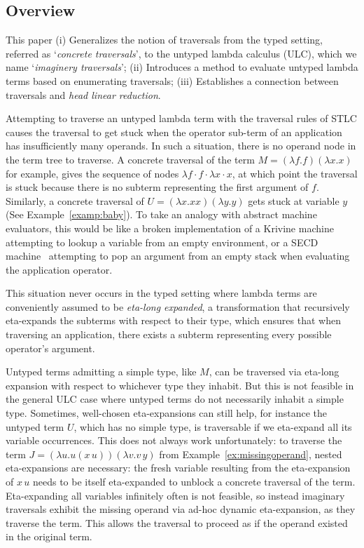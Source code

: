 \documentclass{elsarticle}
\theoremstyle{plain}
\theoremstyle{definition}
\begin{document}
\subsection{Overview}
This paper
(i) Generalizes the notion of traversals from the typed setting, referred as `\emph{concrete traversals}', to the untyped lambda calculus (ULC), which we name `\emph{imaginery traversals}';
(ii) Introduces a method to evaluate untyped lambda terms based on enumerating traversals;
(iii) Establishes a connection between traversals and \emph{head linear reduction}.

Attempting to traverse an untyped lambda term with the
traversal rules of STLC causes the traversal to get stuck when the operator sub-term of an application has insufficiently many operands. In such a situation, there is no operand node in the term tree to traverse.
A concrete traversal of the term $M = (\lambda f.f)(\lambda x.x)$ for example,  gives the sequence of nodes $\lambda f \cdot f \cdot \lambda x \cdot x$, at which point the traversal is stuck because there is no subterm representing the first argument of $f$.
Similarly, a concrete traversal of $U = (\lambda x. x x)(\lambda y. y)$ gets  stuck at variable $y$ (See Example~\ref{examp:baby}). To take an analogy with abstract machine evaluators, this would be like a broken implementation of a Krivine machine~\cite{Krivine2007} attempting to lookup a variable from an empty environment, or a SECD machine~\cite{landin-secd} attempting to pop an argument from an empty stack when evaluating the application operator.

This situation never occurs in the typed setting where lambda terms are
conveniently assumed to be \emph{eta-long expanded}, a transformation that recursively eta-expands the subterms with respect to their type,
which ensures that when traversing an application, there exists a subterm representing every possible operator's argument.

Untyped terms admitting a simple type, like $M$, can be traversed via eta-long expansion with respect to whichever type they inhabit.
But this is not feasible in the general ULC case where untyped terms do not necessarily inhabit a simple type.
Sometimes, well-chosen eta-expansions can still help, for instance the untyped term $U$, which has no simple type, is traversable if we eta-expand all its variable occurrences. This does not always work unfortunately: to traverse the
term $J = (\lambda u . u(x\, u)) (\lambda v . v\, y)$ from
 Example~\ref{ex:missingoperand}, nested eta-expansions are necessary:
 the fresh variable resulting from the eta-expansion of $x\, u$ needs to be itself eta-expanded to unblock a concrete traversal of the term.
 Eta-expanding all variables infinitely often is not feasible, so instead imaginary traversals exhibit the missing operand via ad-hoc dynamic eta-expansion, as they traverse the term.
 This allows the traversal to proceed as if the operand existed in the original term.
\end{document}
